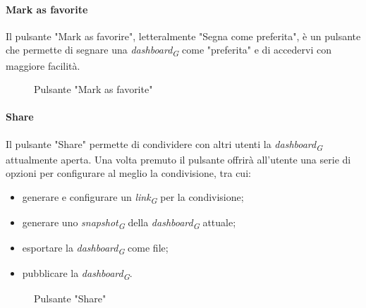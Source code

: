 \paragraph{Mark as favorite}
Il pulsante "Mark as favorire", letteralmente "Segna come preferita", è un pulsante che permette di segnare una \textit{dashboard}\textsubscript{\textit{G}} come "preferita" e di accedervi con maggiore facilità.
\begin{figure}[H]
    \centering
    \caption{Pulsante "Mark as favorite"}
    \label{fig:my_label}
\end{figure}

\paragraph{Share}
Il pulsante "Share" permette di condividere con altri utenti la \textit{dashboard}\textsubscript{\textit{G}} attualmente aperta. Una volta premuto il pulsante offrirà all'utente una serie di opzioni per configurare al meglio la condivisione, tra cui: 
\begin{itemize}
    \item generare e configurare un \textit{link}\textsubscript{\textit{G}} per la condivisione;
    \item generare uno \textit{snapshot}\textsubscript{\textit{G}} della \textit{dashboard}\textsubscript{\textit{G}} attuale;
    \item esportare la \textit{dashboard}\textsubscript{\textit{G}} come file;
    \item pubblicare la \textit{dashboard}\textsubscript{\textit{G}}.
\end{itemize}
\begin{figure}[H]
    \centering
    \caption{Pulsante "Share"}
    \label{fig:my_label}
\end{figure}

